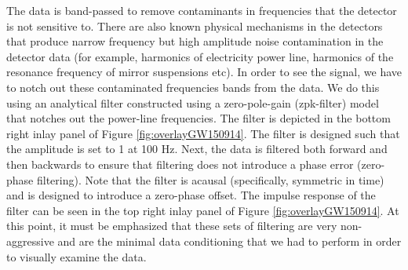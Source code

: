 The data is band-passed to remove contaminants in frequencies that the detector is not sensitive to.  There are also known physical mechanisms in the detectors that produce narrow frequency but high amplitude noise contamination in the detector data (for example, harmonics of electricity power line, harmonics of the resonance frequency of mirror suspensions etc). In order to see the signal, we have to notch out these contaminated frequencies bands from the data. We do this using an analytical filter constructed using a zero-pole-gain (zpk-filter) model that notches out the power-line frequencies. The filter is depicted in the bottom right inlay panel of Figure \ref{fig:overlayGW150914}. The filter is designed such that the amplitude is set to 1 at 100 Hz. Next, the data is filtered both forward and then backwards to ensure that filtering does not introduce a phase error (zero-phase filtering).  Note that the filter is acausal (specifically, symmetric in time) and is designed to introduce a zero-phase offset. The impulse response of the filter can be seen in the top right inlay panel of Figure \ref{fig:overlayGW150914}. At this point, it must be emphasized that these sets of filtering are very non-aggressive and are the minimal data conditioning that we had to perform in order to visually examine the data. 





